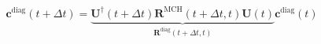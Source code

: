 \documentclass{article}
\renewcommand{\vec}[1]{\ensuremath{\mathbf{#1}}}
\begin{document}
\begin{equation}
  \vec{c}^{\text{diag}}(t+\Delta t)=\underbrace{\vec{U}^\dagger(t+\Delta t)\vec{R}^{\text{MCH}}(t+\Delta t,t)\vec{U}(t)}_{\vec{R}^{\text{diag}}(t+\Delta t,t)}\vec{c}^{\text{diag}}(t)
\nonumber\end{equation}
\end{document}
